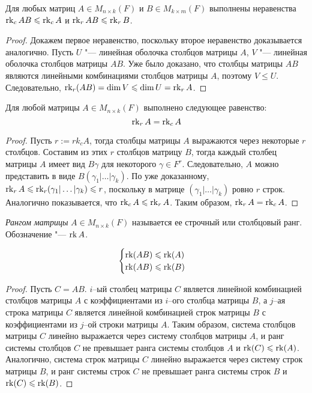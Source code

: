     \begin{proposition}
    	Для любых матриц $A \in M_{n \times k}(F)$ и $B \in M_{k \times m}(F)$ выполнены неравенства $\operatorname{rk}_c{AB} \leqslant \operatorname{rk}_cA$ и $\operatorname{rk}_r{AB} \leqslant \operatorname{rk}_rB$.
    \end{proposition}
    
    \begin{proof}
    	Докажем первое неравенство, поскольку второе неравенство доказывается аналогично. Пусть $U$ "--- линейная оболочка столбцов матрицы $A$, $V$ "--- линейная оболочка столбцов матрицы $AB$. Уже было доказано, что столбцы матрицы $AB$ являются линейными комбинациями столбцов матрицы $A$, поэтому $V \le U$. Следовательно, $\rk_r(AB) = \dim{V} \le \dim{U} \hm{=} \rk_rA$.
    \end{proof}
    
    \begin{theorem}
    	Для любой матрицы $A \in M_{n \times k}(F)$ выполнено следующее равенство:
    	\[\operatorname{rk}_rA = \operatorname{rk}_cA\]
    \end{theorem}
    
    \begin{proof}
    	Пусть $r := rk_cA$, тогда столбцы матрицы $A$ выражаются через некоторые $r$ столбцов. Составим из этих $r$ столбцов матрицу $B$, тогда каждый столбец матрицы $A$ имеет вид $B\gamma$ для некоторого $\gamma \in F^r$. Следовательно, $A$ можно представить в виде $B(\gamma_1|\dots|\gamma_k)$. По уже доказанному, $\operatorname{rk}_rA \leqslant \operatorname{rk}_r(\gamma_1|\dots|\gamma_k) \leqslant r$, поскольку в матрице $(\gamma_1|\dots|\gamma_k)$ ровно $r$ строк. Аналогично показывается, что $\operatorname{rk}_cA \leqslant \operatorname{rk}_rA$. Таким образом, $\operatorname{rk}_rA = \operatorname{rk}_cA$.
    \end{proof}
    
    \begin{definition}
    	\textit{Рангом матрицы} $A \in M_{n \times k}(F)$ называется ее строчный или столбцовый ранг. Обозначение "--- $\operatorname{rk}{A}$.
    \end{definition}
    
    \begin{theorem}
        \[\begin{cases}
            \operatorname{rk}(AB) \leqslant \operatorname{rk}(A) \\
            \operatorname{rk}(AB) \leqslant \operatorname{rk}(B)
        \end{cases}\]
    \end{theorem}
    
    \begin{proof}
        Пусть $C = AB$. $i$--ый столбец матрицы $C$ является линейной комбинацией столбцов матрицы $A$ с коэффициентами из $i$--ого столбца матрицы $B$, а $j$--ая строка матрицы $C$ является линейной комбинацией строк матрицы $B$ с коэффициентами из $j$--ой строки матрицы $A$. Таким образом, система столбцов матрицы $C$ линейно выражается через систему столбцов матрицы $A$, и ранг системы столбцов $C$ не превышает ранга системы столбцов $A$ и $\operatorname{rk}(C) \leqslant \operatorname{rk}(A)$. Аналогично, система строк матрицы $C$ линейно выражается через систему строк матрицы $B$, и ранг системы строк $C$ не превышает ранга системы строк $B$ и $\operatorname{rk}(C) \leqslant \operatorname{rk}(B)$. 
    \end{proof}
    
